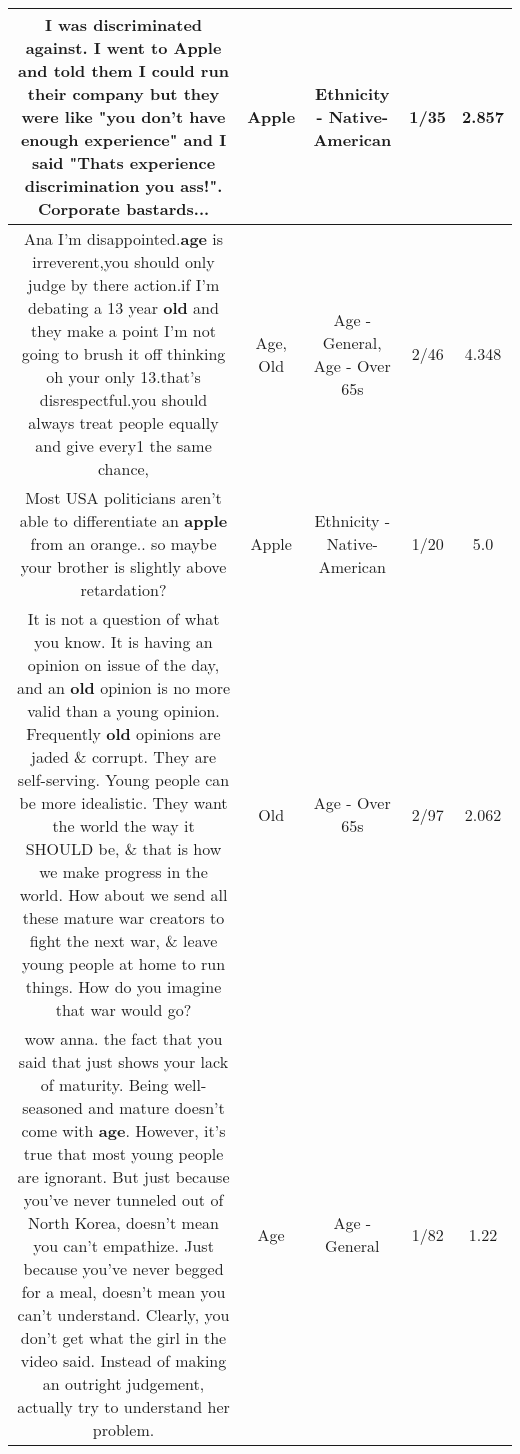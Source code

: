 \documentclass[11pt]{article}
\newlength\mylength
\begin{document}
\begin{center}
\begin{longtable}{|C{.65\mylength}|C{.30\mylength}|C{.12\mylength}|C{.12\mylength}|C{.12\mylength}|}
  \small I was discriminated against. I went to \textbf{Apple} and told them I could run their company but they were like "you don't have enough experience" and I said "Thats experience discrimination you ass!". Corporate bastards...\normalsize   & Apple & Ethnicity - Native-American & 1/35 & 2.857 \\  \hline
  \small Ana I'm disappointed.\textbf{age} is irreverent,you should only judge by there action.if I'm debating a 13 year \textbf{old} and they make a point I'm not going to brush it off thinking oh your only 13.that's disrespectful.you should always treat people equally and give every1 the same chance,\normalsize   & Age, Old & Age - General, Age - Over 65s & 2/46 & 4.348 \\  \hline
  \small Most USA politicians aren't able to differentiate an \textbf{apple} from an orange.. so maybe your brother is slightly above retardation?\normalsize   & Apple & Ethnicity - Native-American & 1/20 & 5.0 \\  \hline
  \small It is not a question of what you know. It is having an opinion on issue of the day, and an \textbf{old} opinion is no more valid than a young opinion. Frequently \textbf{old} opinions are jaded \& corrupt. They are self-serving. Young people can be more idealistic. They want the world the way it SHOULD be, \& that is how we make progress in the world. How about we send all these mature war creators to fight the next war, \& leave young people at home to run things. How do you imagine that war would go?\normalsize   & Old & Age - Over 65s & 2/97 & 2.062 \\  \hline
  \small wow anna. the fact that you said that just shows your lack of maturity. Being well-seasoned and mature doesn't come with \textbf{age}. However, it's true that most young people are ignorant. But just because you've never tunneled out of North Korea, doesn't mean you can't empathize. Just because you've never begged for a meal, doesn't mean you can't understand. Clearly, you don't get what the girl in the video said. Instead of making an outright judgement, actually try to understand her problem.\normalsize   & Age & Age - General & 1/82 & 1.22 \\  \hline

\end{longtable}
\end{center}
\end{document}
